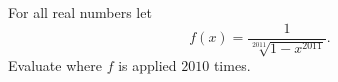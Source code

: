 For all real numbers  let \[ f(x) = \frac{1}{\sqrt[2011]{1-x^{2011}}}. \] Evaluate  where $f$ is applied $2010$ times.